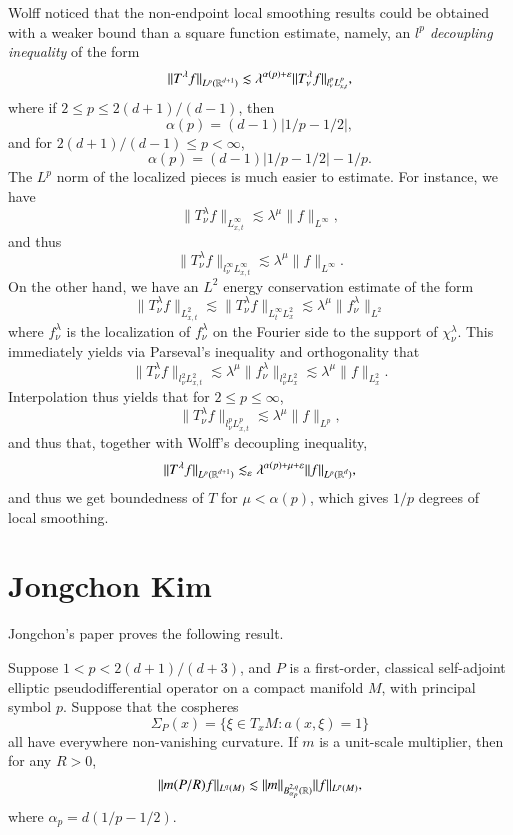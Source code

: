 Wolff noticed that the non-endpoint local smoothing results could be obtained with a weaker bound than a square function estimate, namely, an \emph{$l^p$ decoupling inequality} of the form
%
\[ \| T^\lambda f \|_{L^p(\operatorname{\mathbb{R}}^{d+1})} \lesssim \lambda^{\alpha(p) + \varepsilon} \| T^\lambda_\nu f \|_{l^p_\nu L^p_{x,t}}, \]
%
where if $2 \leq p \leq 2(d+1)/(d-1)$, then
%
\[ \alpha(p) = (d-1)|1/p - 1/2|, \] 
%
and for $2(d+1)/(d-1) \leq p < \infty$,
%
\[ \alpha(p) = (d-1)|1/p - 1/2| - 1/p. \]
%
The $L^p$ norm of the localized pieces is much easier to estimate. For instance, we have
%
\[ \| T^\lambda_\nu f \|_{L^\infty_{x,t}} \lesssim \lambda^\mu \| f \|_{L^\infty}, \]
%
and thus
%
\[ \| T^\lambda_\nu f \|_{l^\infty_\nu L^\infty_{x,t}} \lesssim \lambda^\mu \| f \|_{L^\infty}. \]
%
On the other hand, we have an $L^2$ energy conservation estimate of the form
%
\[ \| T^\lambda_\nu f \|_{L^2_{x,t}} \lesssim \| T^\lambda_\nu f \|_{L^\infty_t L^2_x} \lesssim \lambda^\mu \| f^\lambda_\nu \|_{L^2} \]
%
where $f^\lambda_\nu$ is the localization of $f^\lambda_\nu$ on the Fourier side to the support of $\chi^\lambda_\nu$. This immediately yields via Parseval's inequality and orthogonality that
%
\[ \| T^\lambda_\nu f \|_{l^2_\nu L^2_{x,t}} \lesssim \lambda^\mu \| f^\lambda_\nu \|_{l^2_\nu L^2_x} \lesssim \lambda^\mu \| f \|_{L^2_x}. \]
%
Interpolation thus yields that for $2 \leq p \leq \infty$,
%
\[ \| T^\lambda_\nu f \|_{l^p_\nu L^p_{x,t}} \lesssim \lambda^\mu \| f \|_{L^p}, \]
%
and thus that, together with Wolff's decoupling inequality,
%
\[ \| T^\lambda f \|_{L^p(\operatorname{\mathbb{R}}^{d+1})} \lesssim_\varepsilon \lambda^{\alpha(p) + \mu + \varepsilon} \| f \|_{L^p(\operatorname{\mathbb{R}}^d)}, \]
%
and thus we get boundedness of $T$ for $\mu < \alpha(p)$, which gives $1/p$ degrees of local smoothing.












\chapter{Jongchon Kim}

Jongchon's paper proves the following result.

\begin{theorem}
    Suppose $1 < p < 2(d+1)/(d+3)$, and $P$ is a first-order, classical self-adjoint elliptic pseudodifferential operator on a compact manifold $M$, with principal symbol $p$. Suppose that the cospheres
    \[ \Sigma_P(x) = \{ \xi \in T_x M : a(x,\xi) = 1 \} \]
    all have everywhere non-vanishing curvature. If $m$ is a unit-scale multiplier, then for any $R > 0$,
    \[ \| m(P/R) f \|_{L^q(M)} \lesssim \| m \|_{B^{2,q}_{\alpha_p}(\operatorname{\mathbb{R}})} \| f \|_{L^p(M)}, \]
    where $\alpha_p = d(1/p - 1/2)$.
\end{theorem}

